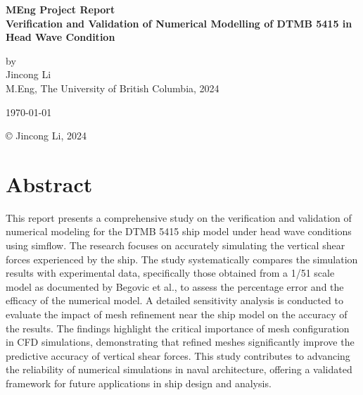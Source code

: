 \documentclass[12pt]{article} %
\begin{document}
\setlength{\parskip}{1em} 
\setlength{\parindent}{0pt}
\newcommand{\vect}[1]{\mathbf{#1}}

\begin{titlepage}  %
    \centering    %

    \vspace*{2cm}
    
    \normalsize \textbf{MEng Project Report} \\
    \vspace{0.5cm}  %
    \normalsize\textbf{Verification and Validation of Numerical Modelling of DTMB 5415 in Head Wave Condition} \\
    \vspace{2cm}  %
    
    \normalsize by\\
    \vspace{1cm}
    \normalsize Jincong Li \\ 
    \vspace{1cm}
    \normalsize M.Eng, The University of British Columbia, 2024
    \vspace{11cm}  %
    
    \normalsize \today

    \vfill  %
    © Jincong Li, 2024
\end{titlepage}
\tableofcontents
\newpage
\section*{Abstract}
This report presents a comprehensive study on the verification and validation of numerical modeling 
for the DTMB 5415 ship model under head wave conditions using simflow. The research focuses on 
accurately simulating the vertical shear forces experienced by the ship. The study systematically 
compares the simulation results with experimental data, specifically those obtained from a 1/51 scale model 
as documented by Begovic et al., 
to assess the percentage error and the efficacy of the numerical model. A detailed sensitivity analysis 
is conducted to evaluate the impact of mesh refinement near the ship model on the accuracy of the results. 
The findings highlight the critical importance of mesh configuration in CFD simulations, demonstrating 
that refined meshes significantly improve the predictive accuracy of vertical shear forces. 
This study contributes to advancing the reliability of numerical simulations in naval architecture,
offering a validated framework for future applications in ship design and analysis.
\end{document}
